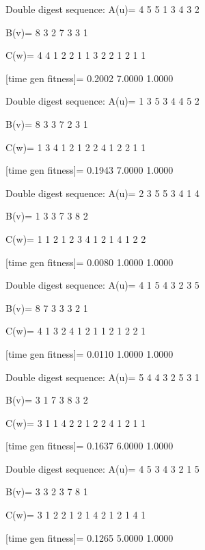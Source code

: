 Double digest sequence:
A(u)=
     4     5     5     1     3     4     3     2

B(v)=
     8     3     2     7     3     3     1

C(w)=
     4     4     1     2     2     1     1     3     2     2     1     2     1     1

[time gen fitness]=
    0.2002    7.0000    1.0000

Double digest sequence:
A(u)=
     1     3     5     3     4     4     5     2

B(v)=
     8     3     3     7     2     3     1

C(w)=
     1     3     4     1     2     1     2     2     4     1     2     2     1     1

[time gen fitness]=
    0.1943    7.0000    1.0000

Double digest sequence:
A(u)=
     2     3     5     5     3     4     1     4

B(v)=
     1     3     3     7     3     8     2

C(w)=
     1     1     2     1     2     3     4     1     2     1     4     1     2     2

[time gen fitness]=
    0.0080    1.0000    1.0000

Double digest sequence:
A(u)=
     4     1     5     4     3     2     3     5

B(v)=
     8     7     3     3     3     2     1

C(w)=
     4     1     3     2     4     1     2     1     1     2     1     2     2     1

[time gen fitness]=
    0.0110    1.0000    1.0000

Double digest sequence:
A(u)=
     5     4     4     3     2     5     3     1

B(v)=
     3     1     7     3     8     3     2

C(w)=
     3     1     1     4     2     2     1     2     2     4     1     2     1     1

[time gen fitness]=
    0.1637    6.0000    1.0000

Double digest sequence:
A(u)=
     4     5     3     4     3     2     1     5

B(v)=
     3     3     2     3     7     8     1

C(w)=
     3     1     2     2     1     2     1     4     2     1     2     1     4     1

[time gen fitness]=
    0.1265    5.0000    1.0000

